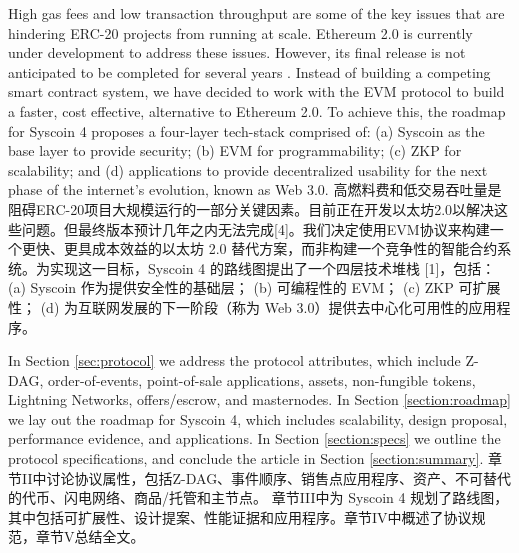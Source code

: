 \documentclass{ctexart}
\begin{document}
High gas fees and low transaction throughput are some of the key issues that are hindering ERC-20 projects from running at scale. Ethereum 2.0 is currently under development to address these issues. However, its final release is not anticipated to be completed for several years \cite{But19}. Instead of building a competing smart contract system, we have decided to work with the EVM protocol to build a faster, cost effective, alternative to Ethereum 2.0. To achieve this, the roadmap for Syscoin 4 proposes a four-layer tech-stack \cite{Sig21} comprised of: (a) Syscoin as the base layer to provide security; (b) EVM for programmability; (c) ZKP for scalability; and (d) applications to provide decentralized usability for the next phase of the internet's evolution, known as Web 3.0. 高燃料费和低交易吞吐量是阻碍ERC-20项目大规模运行的一部分关键因素。目前正在开发以太坊2.0以解决这些问题。但最终版本预计几年之内无法完成[4]。我们决定使用EVM协议来构建一个更快、更具成本效益的以太坊 2.0 替代方案，而非构建一个竞争性的智能合约系统。为实现这一目标，Syscoin 4 的路线图提出了一个四层技术堆栈 [1]，包括： (a) Syscoin 作为提供安全性的基础层； (b) 可编程性的 EVM； (c) ZKP 可扩展性； (d) 为互联网发展的下一阶段（称为 Web 3.0）提供去中心化可用性的应用程序。

In Section \ref{sec:protocol} we address the protocol attributes, which include Z-DAG, order-of-events, point-of-sale applications, assets, non-fungible tokens, Lightning Networks, offers/escrow, and masternodes. In Section \ref{section:roadmap} we lay out the roadmap for Syscoin 4, which includes scalability, design proposal, performance evidence, and applications. In Section \ref{section:specs} we outline the protocol specifications, and conclude the article in Section \ref{section:summary}. 章节II中讨论协议属性，包括Z-DAG、事件顺序、销售点应用程序、资产、不可替代的代币、闪电网络、商品/托管和主节点。 章节III中为 Syscoin 4 规划了路线图，其中包括可扩展性、设计提案、性能证据和应用程序。章节IV中概述了协议规范，章节V总结全文。
\end{document}
